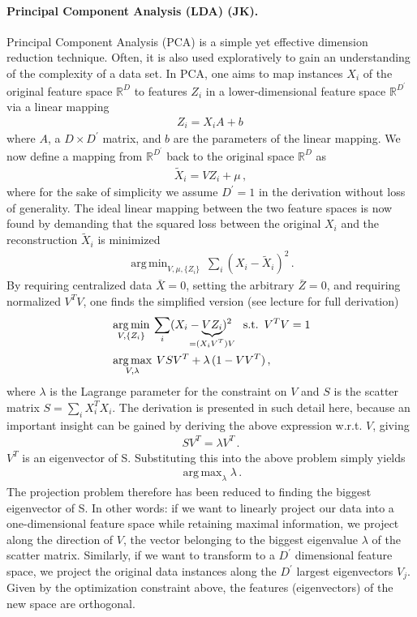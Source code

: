 \documentclass[12pt, a4paper]{scrartcl}
\DeclareMathOperator*{\argmin}{arg\,min}
\DeclareMathOperator*{\argmax}{arg\,max}
\begin{document}
\paragraph{Principal Component Analysis (LDA) (JK).} Principal Component Analysis (PCA) is a simple yet effective dimension reduction technique. Often, it is also used exploratively to gain an understanding of the complexity of a data set. In PCA, one aims to map instances $X_i$ of the original feature space $\mathbb{R}^D$ to features $Z_i$ in a lower-dimensional feature space $\mathbb{R}^{D^\prime}$ via a linear mapping
\begin{align}
	Z_i = X_i A + b \, 
\end{align}
where $A$, a $D\times D^\prime$ matrix, and $b$ are the parameters of the linear mapping. We now define a mapping from $\mathbb{R}^{D^\prime}$  back to the original space $\mathbb{R}^D$ as
\begin{align}
	\tilde{X}_i = V Z_i + \mu \, ,
\end{align}
where for the sake of simplicity we assume $D^\prime=1$ in the derivation without loss of generality.
The ideal linear mapping between the two feature spaces is now found by demanding that the squared loss between the original $X_i$ and the reconstruction $\tilde{X}_i$ is minimized
\begin{align}
	\argmin_{V, \mu, \{Z_i\}} \: \sum_i \left( X_i - \tilde{X}_i \right)^2 \, .
\end{align}
By requiring centralized data $\bar{X}=0$, setting the arbitrary $\bar{Z}=0$, and requiring normalized $V^TV$, one finds the simplified version (see lecture for full derivation)
\begin{align}
	&\argmin_{V, \{Z_i\}} \: \sum_i ( X_i - 
														\underbrace{V Z_i}_{\mathclap{=(X_i V^T)V}}
														)^2 \quad
														\text{s.t.} \enspace V^TV=1  \\
	&\argmax_{V, \lambda} \: VSV^T + \lambda \,  (1-VV^T) \, ,													\end{align}
where $\lambda$ is the Lagrange parameter for the constraint on $V$ and $S$ is the scatter matrix $S = \sum_i X_i^T X_i$. 
The derivation is presented in such detail here, because an important insight can be gained  by deriving the above expression w.r.t. $V$, giving
\begin{align}
	S V^T = \lambda V^T \, .
\end{align}
$V^T$ is an eigenvector of S. Substituting this into the above problem simply yields
\begin{align}
	\argmax_\lambda \lambda \, .
\end{align}
The projection problem therefore has been reduced to finding the biggest eigenvector of S. In other words: if we want to linearly project our data into a one-dimensional feature space while retaining maximal information, we project along the direction of $V$, the vector belonging to the biggest eigenvalue $\lambda$ of the scatter matrix. Similarly, if we want to transform to a $D^\prime$ dimensional feature space, we project the original data instances along the $D^\prime$ largest eigenvectors $V_j$. Given by the optimization constraint above, the features (eigenvectors) of the new space are orthogonal. 
\end{document}
